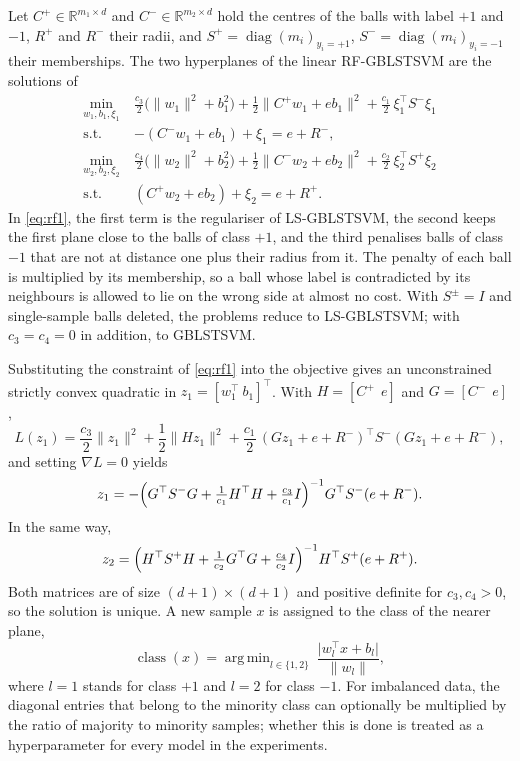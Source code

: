 \documentclass[preprint,12pt]{elsarticle}
\newcommand{\R}{\mathbb{R}}
\newcommand{\RF}{RF-GBLSTSVM}
\DeclareMathOperator*{\argmin}{arg\,min}
\begin{document}
Let $C^{+}\in\R^{m_1\times d}$ and $C^{-}\in\R^{m_2\times d}$ hold the centres of the balls with label $+1$ and $-1$, $R^{+}$ and $R^{-}$ their radii, and $S^{+}=\operatorname{diag}(m_i)_{y_i=+1}$, $S^{-}=\operatorname{diag}(m_i)_{y_i=-1}$ their memberships. The two hyperplanes of the linear \RF{} are the solutions of
\begin{align}
\min_{w_1,b_1,\xi_1}\ & \frac{c_3}{2}\bigl(\lVert w_1\rVert^{2}+b_1^{2}\bigr)+\frac{1}{2}\lVert C^{+}w_1+eb_1\rVert^{2}+\frac{c_1}{2}\,\xi_1^{\top}S^{-}\xi_1 \nonumber\\
\text{s.t.}\ & -(C^{-}w_1+eb_1)+\xi_1=e+R^{-}, \label{eq:rf1}\\[4pt]
\min_{w_2,b_2,\xi_2}\ & \frac{c_4}{2}\bigl(\lVert w_2\rVert^{2}+b_2^{2}\bigr)+\frac{1}{2}\lVert C^{-}w_2+eb_2\rVert^{2}+\frac{c_2}{2}\,\xi_2^{\top}S^{+}\xi_2 \nonumber\\
\text{s.t.}\ & (C^{+}w_2+eb_2)+\xi_2=e+R^{+}. \label{eq:rf2}
\end{align}
In \eqref{eq:rf1}, the first term is the regulariser of LS-GBLSTSVM, the second keeps the first plane close to the balls of class $+1$, and the third penalises balls of class $-1$ that are not at distance one plus their radius from it. The penalty of each ball is multiplied by its membership, so a ball whose label is contradicted by its neighbours is allowed to lie on the wrong side at almost no cost. With $S^{\pm}=I$ and single-sample balls deleted, the problems reduce to LS-GBLSTSVM; with $c_3=c_4=0$ in addition, to GBLSTSVM.

Substituting the constraint of \eqref{eq:rf1} into the objective gives an unconstrained strictly convex quadratic in $z_1=[w_1^{\top}\ b_1]^{\top}$. With $H=[C^{+}\ \ e]$ and $G=[C^{-}\ \ e]$,
\[
L(z_1)=\frac{c_3}{2}\lVert z_1\rVert^{2}+\frac{1}{2}\lVert Hz_1\rVert^{2}+\frac{c_1}{2}\,(Gz_1+e+R^{-})^{\top}S^{-}(Gz_1+e+R^{-}),
\]
and setting $\nabla L=0$ yields
\begin{equation}
z_1=-\Bigl(G^{\top}S^{-}G+\tfrac{1}{c_1}H^{\top}H+\tfrac{c_3}{c_1}I\Bigr)^{-1}G^{\top}S^{-}(e+R^{-}).
\label{eq:sol1}
\end{equation}
In the same way,
\begin{equation}
z_2=\Bigl(H^{\top}S^{+}H+\tfrac{1}{c_2}G^{\top}G+\tfrac{c_4}{c_2}I\Bigr)^{-1}H^{\top}S^{+}(e+R^{+}).
\label{eq:sol2}
\end{equation}
Both matrices are of size $(d+1)\times(d+1)$ and positive definite for $c_3,c_4>0$, so the solution is unique. A new sample $x$ is assigned to the class of the nearer plane,
\begin{equation}
\operatorname{class}(x)=\argmin_{l\in\{1,2\}}\ \frac{\lvert w_l^{\top}x+b_l\rvert}{\lVert w_l\rVert},
\label{eq:decision}
\end{equation}
where $l=1$ stands for class $+1$ and $l=2$ for class $-1$. For imbalanced data, the diagonal entries that belong to the minority class can optionally be multiplied by the ratio of majority to minority samples; whether this is done is treated as a hyperparameter for every model in the experiments.
\end{document}
